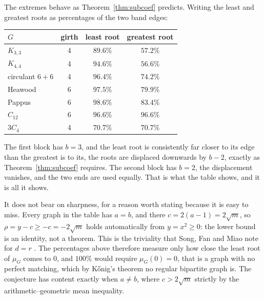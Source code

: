 \documentclass[11pt]{article}
\theoremstyle{remark}
\begin{document}
The extremes behave as Theorem~\ref{thm:subcoef} predicts. Writing the least and
greatest roots as percentages of the two band edges:
\begin{center}
\begin{tabular}{lccc}
\hline
$G$ & girth & least root & greatest root\\
\hline
$K_{3,3}$ & 4 & $89.6\%$ & $57.2\%$\\
$K_{4,4}$ & 4 & $94.6\%$ & $56.6\%$\\
circulant $6+6$ & 4 & $96.4\%$ & $74.2\%$\\
Heawood & 6 & $97.5\%$ & $79.9\%$\\
Pappus & 6 & $98.6\%$ & $83.4\%$\\
\hline
$C_{12}$ & 6 & $96.6\%$ & $96.6\%$\\
$3C_4$ & 4 & $70.7\%$ & $70.7\%$\\
\hline
\end{tabular}
\end{center}
The first block has $b=3$, and the least root is consistently far closer to its
edge than the greatest is to its, the roots are displaced downwards by $b-2$,
exactly as Theorem~\ref{thm:subcoef} requires. The second block has $b=2$, the
displacement vanishes, and the two ends are used equally. That is what the table
shows, and it is all it shows.

It does not bear on sharpness, for a reason worth stating because it is easy to
miss. Every graph in the table has $a=b$, and there $c=2(a-1)=2\sqrt m$, so
$\rho=y-c\ge-c=-2\sqrt m$ holds automatically from $y=x^2\ge0$: the lower bound is
an identity, not a theorem. This is the triviality that Song, Fan and Miao note
for $d=r$ \cite{SFM}. The percentages above therefore measure only how close the
least root of $\mu_G$ comes to $0$, and $100\%$ would require $\mu_G(0)=0$, that
is a graph with no perfect matching, which by K\H onig's theorem no regular
bipartite graph is. The conjecture has content exactly when $a\ne b$, where
$c>2\sqrt m$ strictly by the arithmetic--geometric mean inequality.
\end{document}
